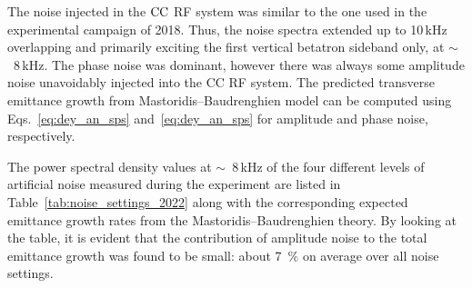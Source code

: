 The noise injected in the ${\mathrm{CC}}$ RF system was similar to the one used in the experimental campaign of 2018. Thus, the noise spectra extended up to 10\,kHz overlapping and primarily exciting the first vertical betatron sideband only, at $\sim$~8\,kHz. The phase noise was dominant, however there was always some amplitude noise unavoidably injected into the CC RF system. The predicted transverse emittance growth from Mastoridis--Baudrenghien model can be computed using Eqs.~\eqref{eq:dey_an_sps} and~\eqref{eq:dey_an_sps} for amplitude and phase noise, respectively.

The power spectral density values at $\sim$~8\,kHz of the four different levels of artificial noise measured during the experiment are listed in Table~\ref{tab:noise_settings_2022} along with the corresponding expected emittance growth rates from the Mastoridis--Baudrenghien theory. By looking at the table, it is evident that the contribution of amplitude noise to the total emittance growth was found to be small: about 7~$\%$ on average over all noise settings.








